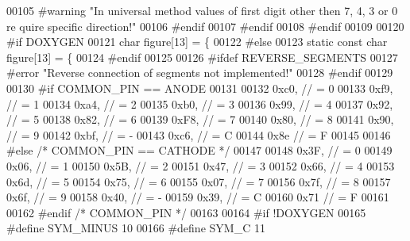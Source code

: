 \begin{DoxyCode}
00105 \textcolor{preprocessor}{}\textcolor{preprocessor}{   #warning "In universal method values of first digit other then 7, 4, 3 or 0 re
      quire specific direction!"}
00106 \textcolor{preprocessor}{}\textcolor{preprocessor}{   #endif}
00107 \textcolor{preprocessor}{}\textcolor{preprocessor}{  #endif}
00108 \textcolor{preprocessor}{}\textcolor{preprocessor}{#endif}
00109 \textcolor{preprocessor}{}
00120 \textcolor{preprocessor}{#if DOXYGEN}
00121 \textcolor{preprocessor}{}\textcolor{keywordtype}{char} figure[13] = \{
00122 \textcolor{preprocessor}{#else}
00123 \textcolor{preprocessor}{}\textcolor{keyword}{static} \textcolor{keyword}{const} \textcolor{keywordtype}{char} figure[13] = \{
00124 \textcolor{preprocessor}{#endif}
00125 \textcolor{preprocessor}{}
00126 \textcolor{preprocessor}{#ifdef REVERSE\_SEGMENTS}
00127 \textcolor{preprocessor}{}\textcolor{preprocessor}{#error "Reverse connection of segments not implemented!"}
00128 \textcolor{preprocessor}{}\textcolor{preprocessor}{#endif}
00129 \textcolor{preprocessor}{}
00130 \textcolor{preprocessor}{#if COMMON\_PIN == ANODE}
00131 \textcolor{preprocessor}{}
00132   0xc0, \textcolor{comment}{// = 0}
00133   0xf9, \textcolor{comment}{// = 1}
00134   0xa4, \textcolor{comment}{// = 2}
00135   0xb0, \textcolor{comment}{// = 3}
00136   0x99, \textcolor{comment}{// = 4}
00137   0x92, \textcolor{comment}{// = 5}
00138   0x82, \textcolor{comment}{// = 6}
00139   0xF8, \textcolor{comment}{// = 7}
00140   0x80, \textcolor{comment}{// = 8}
00141   0x90, \textcolor{comment}{// = 9}
00142   0xbf, \textcolor{comment}{// = -}
00143   0xc6, \textcolor{comment}{// = C}
00144   0x8e  \textcolor{comment}{// = F}
00145 
00146 \textcolor{preprocessor}{#else }\textcolor{comment}{/* COMMON\_PIN == CATHODE */}
00147 
00148   0x3F, \textcolor{comment}{// = 0}
00149   0x06, \textcolor{comment}{// = 1}
00150   0x5B, \textcolor{comment}{// = 2}
00151   0x47, \textcolor{comment}{// = 3}
00152   0x66, \textcolor{comment}{// = 4}
00153   0x6d, \textcolor{comment}{// = 5}
00154   0x75, \textcolor{comment}{// = 6}
00155   0x07, \textcolor{comment}{// = 7}
00156   0x7f, \textcolor{comment}{// = 8}
00157   0x6f, \textcolor{comment}{// = 9}
00158   0x40, \textcolor{comment}{// = -}
00159   0x39, \textcolor{comment}{// = C}
00160   0x71  \textcolor{comment}{// = F}
00161 
00162 \textcolor{preprocessor}{#endif }\textcolor{comment}{/* COMMON\_PIN */}
00163 
00164 \textcolor{preprocessor}{#if !DOXYGEN}
00165 \textcolor{preprocessor}{}\textcolor{preprocessor}{#define SYM\_MINUS 10}
00166 \textcolor{preprocessor}{}\textcolor{preprocessor}{#define SYM\_C 11}

\end{DoxyCode}
